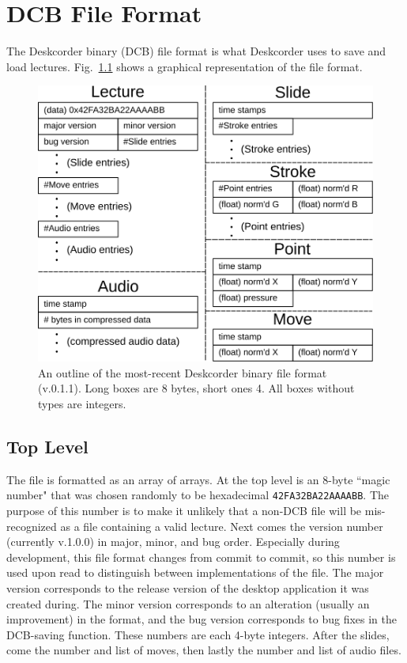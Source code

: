 \documentclass[12pt]{report}
\begin{document}
\chapter{DCB File Format}
The Deskcorder binary (DCB) file format is what Deskcorder uses to save and load lectures.  Fig.~\ref{fig:dcb-ff} shows a graphical representation of the file format.

\begin{figure}[ht]
  \centering
  \includegraphics[width=\columnwidth]{figures/dcb-ff}
  \caption{An outline of the most-recent Deskcorder binary file format (v.0.1.1). Long boxes are 8 bytes, short ones 4. All boxes without types are integers.}
  \label{fig:dcb-ff}
\end{figure}

\section{Top Level}
The file is formatted as an array of arrays.  At the top level is an 8-byte ``magic number" that was chosen randomly to be hexadecimal {\tt 42FA32BA22AAAABB}.  The purpose of this number is to make it unlikely that a non-DCB file will be mis-recognized as a file containing a valid lecture.  Next comes the version number (currently v.1.0.0) in major, minor, and bug order.  Especially during development, this file format changes from commit to commit, so this number is used upon read to distinguish between implementations of the file.  The major version corresponds to the release version of the desktop application it was created during. The minor version corresponds to an alteration (usually an improvement) in the format, and the bug version corresponds to bug fixes in the DCB-saving function.  These numbers are each 4-byte integers.  After the slides, come the number and list of moves, then lastly the number and list of audio files.
\end{document}
